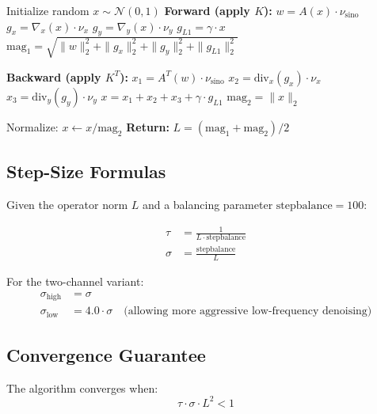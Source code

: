 \documentclass[11pt]{article}
\begin{document}
\begin{algorithm}
\caption{Operator Norm Estimation via Power Iteration}
\begin{algorithmic}
\STATE Initialize random $x \sim \mathcal{N}(0, 1)$
    \STATE \textbf{Forward (apply $K$):}
    \STATE $w = A(x) \cdot \nu_{\text{sino}}$ 
    \STATE $g_x = \nabla_x(x) \cdot \nu_x$ 
    \STATE $g_y = \nabla_y(x) \cdot \nu_y$ 
    \STATE $g_{L1} = \gamma \cdot x$ 
    \STATE $\text{mag}_1 = \sqrt{\|w\|_2^2 + \|g_x\|_2^2 + \|g_y\|_2^2 + \|g_{L1}\|_2^2}$
    
    \STATE \textbf{Backward (apply $K^T$):}
    \STATE $x_1 = A^T(w) \cdot \nu_{\text{sino}}$
    \STATE $x_2 = \text{div}_x(g_x) \cdot \nu_x$
    \STATE $x_3 = \text{div}_y(g_y) \cdot \nu_y$
    \STATE $x = x_1 + x_2 + x_3 + \gamma \cdot g_{L1}$
    \STATE $\text{mag}_2 = \|x\|_2$
    
    \STATE Normalize: $x \leftarrow x/\text{mag}_2$
\ENDFOR
\STATE \textbf{Return:} $L = (\text{mag}_1 + \text{mag}_2)/2$
\end{algorithmic}
\end{algorithm}

\subsection{Step-Size Formulas}

Given the operator norm $L$ and a balancing parameter $\text{stepbalance} = 100$:

\begin{align}
\tau &= \frac{1}{L \cdot \text{stepbalance}} \\
\sigma &= \frac{\text{stepbalance}}{L}
\end{align}

For the two-channel variant:
\begin{align}
\sigma_{\text{high}} &= \sigma \\
\sigma_{\text{low}} &= 4.0 \cdot \sigma \quad \text{(allowing more aggressive low-frequency denoising)}
\end{align}

\subsection{Convergence Guarantee}

The algorithm converges when:
\begin{equation}
\tau \cdot \sigma \cdot L^2 < 1
\end{equation}
\end{document}
